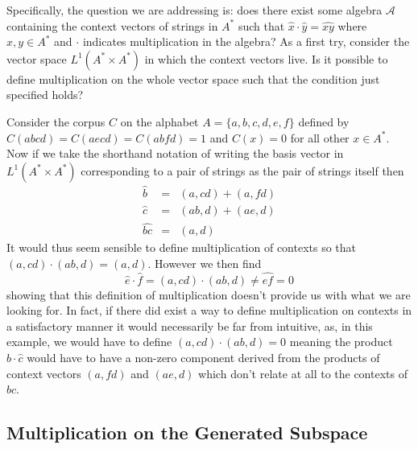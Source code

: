 Specifically, the question we are addressing is: does there exist some algebra $\mathcal{A}$ containing the context vectors of strings in $A^*$ such that $\hat{x}\cdot \hat{y} = \widehat{xy}$ where $x,y\in A^*$ and $\cdot$ indicates multiplication in the algebra? As a first try, consider the vector space $L^1(A^*\times A^*)$ in which the context vectors live. Is it possible to define multiplication on the whole vector space such that the condition just specified holds?

Consider the corpus $C$ on the alphabet $A = \{a,b,c,d,e,f\}$ defined by $C(abcd) = C(aecd) = C(abfd) = 1$ and $C(x) = 0$ for all other $x \in A^*$. Now if we take the shorthand notation of writing the basis vector in $L^1(A^*\times A^*)$ corresponding to a pair of strings as the pair of strings itself then
\begin{eqnarray*}
\hat{b} &=& (a,cd) + (a,fd)\\
\hat{c} &=& (ab,d) + (ae,d)\\
\widehat{bc} &=& (a,d)
\end{eqnarray*}
%
%
It would thus seem sensible to define multiplication of contexts so that $(a,cd)\cdot (ab,d) = (a,d)$. However we then find
$$\hat{e}\cdot \hat{f} = (a,cd)\cdot (ab,d) \neq \widehat{ef} = 0$$
showing that this definition of multiplication doesn't provide us with what we are looking for. In fact, if there did exist a way to define multiplication on contexts in a satisfactory manner it would necessarily be far from intuitive, as, in this example, we would have to define $(a,cd)\cdot (ab,d) = 0$ meaning the product $\hat{b}\cdot\hat{c}$ would have to have a non-zero component derived from the products of context vectors $(a,fd)$ and $(ae,d)$ which don't relate at all to the contexts of $bc$.


\subsection{Multiplication on the Generated Subspace}

